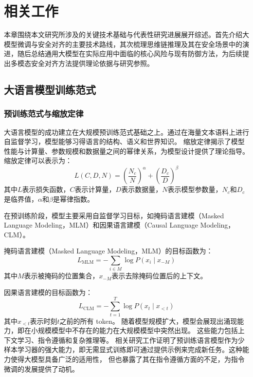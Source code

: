 \chapter{相关工作}
本章围绕本文研究所涉及的关键技术基础与代表性研究进展展开综述。首先介绍大模型微调与安全对齐的主要技术路线，其次梳理思维链推理及其在安全场景中的演进，随后总结通用大模型在实际应用中面临的核心风险与现有防御方法，为后续提出多模态安全对齐方法提供理论依据与研究参照。

\section{大语言模型训练范式}
\subsection{预训练范式与缩放定律}

大语言模型的成功建立在大规模预训练范式基础之上。通过在海量文本语料上进行自监督学习，模型能够习得语言的结构、语义和世界知识。
缩放定律揭示了模型性能与计算量、参数规模和数据量之间的幂律关系，为模型设计提供了理论指导\supercite{DBLP:journals/corr/abs-2001-08361}。缩放定律可以表示为：
\begin{equation}
L(C, D, N) = \left(\frac{N_c}{N}\right)^\alpha + \left(\frac{D_c}{D}\right)^\beta
\end{equation}
其中$L$表示损失函数，$C$表示计算量，$D$表示数据量，$N$表示模型参数量，$N_c$和$D_c$是临界值，$\alpha$和$\beta$是幂律指数。

在预训练阶段，模型主要采用自监督学习目标，如掩码语言建模（Masked Language Modeling，MLM）和因果语言建模（Causal Language Modeling，CLM）。

掩码语言建模（Masked Language Modeling，MLM）的目标函数为：
\begin{equation}
L_{\mathrm{MLM}} = -\sum_{i \in M} \log P(x_i \mid x_{-M})
\end{equation}
其中$M$表示被掩码的位置集合，$x_{-M}$表示去除掩码位置后的上下文。

因果语言建模的目标函数为：
\begin{equation}
L_{\mathrm{CLM}} = -\sum_{t=1}^{T} \log P(x_t \mid x_{<t})
\end{equation}
其中$x_{<t}$表示时刻$t$之前的所有 token。
随着模型规模扩大，模型会展现出涌现能力，即在小规模模型中不存在的能力在大规模模型中突然出现\supercite{wei2022emergentabilitieslargelanguage}。
这些能力包括上下文学习、指令遵循和复杂推理等。
相关研究工作证明了预训练语言模型作为少样本学习器的强大能力，即无需显式训练即可通过提供示例来完成新任务\supercite{DBLP:conf/nips/BrownMRSKDNSSAA20}。这种能力使得大模型具备广泛的适用性，
但也暴露了其在指令遵循方面的不足，为指令微调的发展提供了动机。

